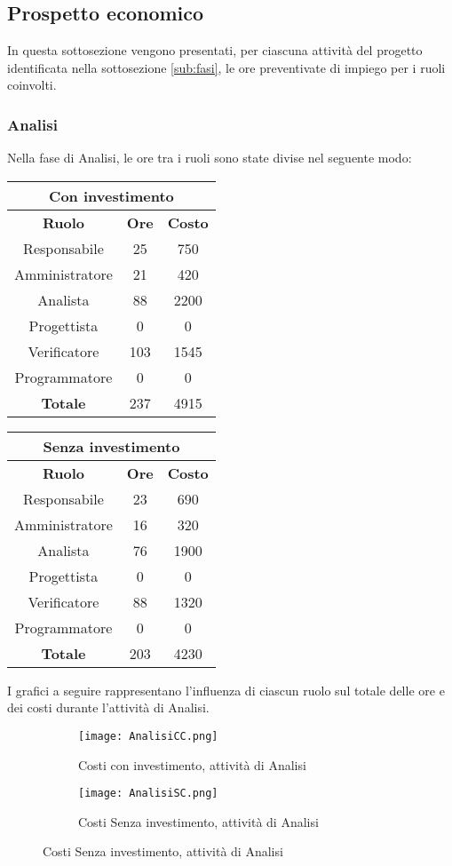 \documentclass{scalatekids-article}
\begin{document}
\subsection{Prospetto economico}
In questa sottosezione vengono presentati, per ciascuna attività del progetto identificata
nella sottosezione \ref{sub:fasi}, le ore preventivate di impiego per i ruoli coinvolti.
\subsubsection{Analisi}
Nella fase di Analisi, le ore tra i ruoli sono state divise nel seguente modo:
\begin{center}
  \normalsize
  \begin{tabular}{| c | c | c |}
    \hline
    \multicolumn{3}{|c|}{\textbf{Con investimento}}\\
    \hline
    \textbf{Ruolo} & \textbf{Ore} & \textbf{Costo}\\
    \hline
    Responsabile & 25 & 750\\
    Amministratore & 21 & 420\\
    Analista & 88 & 2200\\
    Progettista & 0 & 0\\
    Verificatore & 103 & 1545 \\
    Programmatore & 0 & 0 \\
    \hline
    \textbf{Totale} & 237 & 4915\\
    \hline
  \end{tabular}
  \qquad
  \begin{tabular}{| c | c | c |}
    \hline
    \multicolumn{3}{|c|}{\textbf{Senza investimento}}\\
    \hline
    \textbf{Ruolo} & \textbf{Ore} & \textbf{Costo}\\
    \hline
    Responsabile & 23 & 690\\
    Amministratore & 16 & 320\\
    Analista & 76 & 1900\\
    Progettista & 0 & 0\\
    Verificatore & 88 & 1320 \\
    Programmatore & 0 & 0 \\
    \hline
    \textbf{Totale} & 203 & 4230\\
    \hline
  \end{tabular}
\end{center}
I grafici a seguire rappresentano l'influenza di ciascun ruolo sul totale delle ore e dei costi durante l'attività di Analisi.
\begin{figure}[H]
  \begin{subfigure}[H]{0.47\textwidth}
    \texttt{[image: AnalisiCC.png]}
    \caption{Costi con investimento, attività di Analisi}
  \end{subfigure}
  \qquad
  \begin{subfigure}[H]{0.47\textwidth}
    \texttt{[image: AnalisiSC.png]}
    \caption{Costi Senza investimento, attività di Analisi}
  \end{subfigure}
\end{figure}
\newpage
\end{document}

